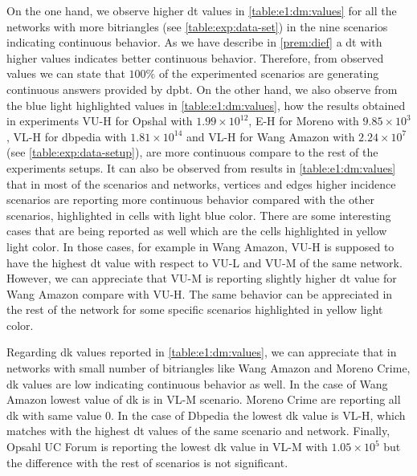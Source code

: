 On the one hand, we observe higher \acrshort{dt} values in \autoref{table:e1:dm:values} for all the networks with more bitriangles (see \autoref{table:exp:data-set}) in the nine scenarios indicating continuous behavior.
As we have describe in \autoref{prem:dief} a \acrshort{dt} with higher values indicates better continuous behavior. Therefore, from observed values we can state that $100\%$ of the experimented scenarios are generating continuous answers provided by \acrshort{dpbt}.
On the other hand, we also observe from the blue light highlighted values in \autoref{table:e1:dm:values}, how the results obtained in experiments VU-H for Opshal with $1.99 \times 10^{12}$, E-H for Moreno with $9.85 \times 10^3$, VL-H for dbpedia with $1.81 \times 10^{14}$ and VL-H for Wang Amazon with $2.24 \times 10^7$ (see \autoref{table:exp:data-setup}), are more continuous compare to the rest of the experiments setups. 
It can also be observed from results in \autoref{table:e1:dm:values} that in most of the scenarios and networks, vertices and edges higher incidence scenarios are reporting more continuous behavior compared with the other scenarios, highlighted in cells with light blue color. 
There are some interesting cases that are being reported as well which are the cells highlighted in yellow light color. In those cases, for example in Wang Amazon, VU-H is supposed to have the highest \acrshort{dt} value with respect to VU-L and VU-M of the same network. However, we can appreciate that VU-M is reporting slightly higher \acrshort{dt} value for Wang Amazon compare with VU-H. 
The same behavior can be appreciated in the rest of the network for some specific scenarios highlighted in yellow light color.

Regarding \acrshort{dk} values reported in \autoref{table:e1:dm:values}, we can appreciate that in networks with small number of bitriangles like Wang Amazon and Moreno Crime, \acrshort{dk} values are low indicating continuous behavior as well.
In the case of Wang Amazon lowest value of \acrshort{dk} is in VL-M scenario. Moreno Crime are reporting all \acrshort{dk} with same value $0$. In the case of Dbpedia the lowest \acrshort{dk} value is VL-H, which matches with the highest \acrshort{dt} values of the same scenario and network.
Finally, Opsahl UC Forum is reporting the lowest \acrshort{dk} value in VL-M with $1.05 \times 10^5$ but the difference with the rest of scenarios is not significant.

